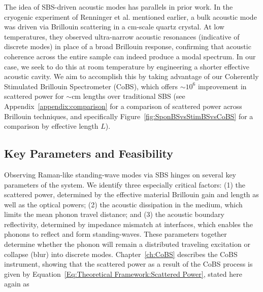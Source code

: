 The idea of \ac{SBS}-driven acoustic modes has parallels in prior work. In the cryogenic experiment of Renninger et al. mentioned earlier, \cite{renninger2018bulk} a bulk acoustic mode was driven via Brillouin scattering in a \si{\centi\meter}-scale quartz crystal. At low temperatures, they observed ultra-narrow acoustic resonances (indicative of discrete modes) in place of a broad Brillouin response, confirming that acoustic coherence across the entire sample can indeed produce a modal spectrum. In our case, we seek to do this at room temperature by engineering a shorter effective acoustic cavity. We aim to accomplish this by taking advantage of our Coherently Stimulated Brillouin Spectrometer (\ac{CoBS}), which offers \(\sim10^{6}\) improvement in scattered power for \(\sim\)\si{\centi\meter} lengths over traditional \ac{SBS} (see Appendix~\ref{appendix:comparison} for a comparison of scattered power across Brillouin techniques, and specifically Figure~\ref{fig:SponBSvsStimBSvsCoBS} for a comparison by effective length \(L\)).

\subsection{Key Parameters and Feasibility}
\label{subsec:Raman:KeyParametersandFeasibility}

Observing Raman-like standing-wave modes via \ac{SBS} hinges on several key parameters of the system. We identify three especially critical factors: (1) the scattered power, determined by the effective material Brillouin gain and length as well as the optical powers; (2) the acoustic dissipation in the medium, which limits the mean phonon travel distance; and (3) the acoustic boundary reflectivity, determined by impedance mismatch at interfaces, which enables the phonons to reflect and form standing-waves. These parameters together determine whether the phonon will remain a distributed traveling excitation or collapse (blur) into discrete modes. Chapter~\ref{ch:CoBS} describes the \ac{CoBS} instrument, showing that the scattered power as a result of the \ac{CoBS} process is given by Equation~\ref{Eq:Theoretical Framework:Scattered Power}, stated here again as

